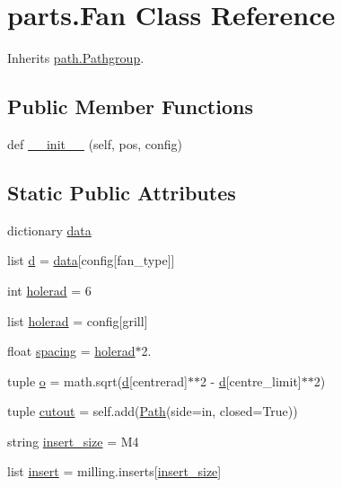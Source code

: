 \hypertarget{classparts_1_1_fan}{}\section{parts.\+Fan Class Reference}
\label{classparts_1_1_fan}


Inherits \hyperlink{classpath_1_1_pathgroup}{path.\+Pathgroup}.

\subsection*{Public Member Functions}
\begin{DoxyCompactItemize}
\item 
def \hyperlink{classparts_1_1_fan_accaa714c47d3bb05538732cd13298e30}{\+\_\+\+\_\+init\+\_\+\+\_\+} (self, pos, config)
\end{DoxyCompactItemize}
\subsection*{Static Public Attributes}
\begin{DoxyCompactItemize}
\item 
dictionary \hyperlink{classparts_1_1_fan_af88998014df582dab7a32bd3d94dc11f}{data}
\item 
list \hyperlink{classparts_1_1_fan_a17ae7e353907459cc49292e092644f27}{d} = \hyperlink{classparts_1_1_fan_af88998014df582dab7a32bd3d94dc11f}{data}\mbox{[}config\mbox{[}\textquotesingle{}fan\+\_\+type\textquotesingle{}\mbox{]}\mbox{]}
\item 
int \hyperlink{classparts_1_1_fan_a8d712cc7fd8c31702b654a2cb8c19ecd}{holerad} = 6
\item 
list \hyperlink{classparts_1_1_fan_a75666d4a0b6dd74f07fe5e84394aa116}{holerad} = config\mbox{[}\textquotesingle{}grill\textquotesingle{}\mbox{]}
\item 
float \hyperlink{classparts_1_1_fan_a23a5526fd6959e6fe44589d052682801}{spacing} = \hyperlink{classparts_1_1_fan_a8d712cc7fd8c31702b654a2cb8c19ecd}{holerad}$\ast$2.
\item 
tuple \hyperlink{classparts_1_1_fan_a33929017332f1dd8d2bac914a8733cee}{o} = math.\+sqrt(\hyperlink{classparts_1_1_fan_a17ae7e353907459cc49292e092644f27}{d}\mbox{[}\textquotesingle{}centrerad\textquotesingle{}\mbox{]}$\ast$$\ast$2 -\/ \hyperlink{classparts_1_1_fan_a17ae7e353907459cc49292e092644f27}{d}\mbox{[}\textquotesingle{}centre\+\_\+limit\textquotesingle{}\mbox{]}$\ast$$\ast$2)
\item 
tuple \hyperlink{classparts_1_1_fan_a43f1ba65e0d6bf40ad6401b00eb42436}{cutout} = self.\+add(\hyperlink{classpath_1_1_path}{Path}(side=\textquotesingle{}in\textquotesingle{}, closed=True))
\item 
string \hyperlink{classparts_1_1_fan_a991d1caf4a1338f8acb1010c27ebc1da}{insert\+\_\+size} = \textquotesingle{}M4\textquotesingle{}
\item 
list \hyperlink{classparts_1_1_fan_a6737154f9b7459e8f98b5b737fcd8733}{insert} = milling.\+inserts\mbox{[}\hyperlink{classparts_1_1_fan_a991d1caf4a1338f8acb1010c27ebc1da}{insert\+\_\+size}\mbox{]}
\end{DoxyCompactItemize}
